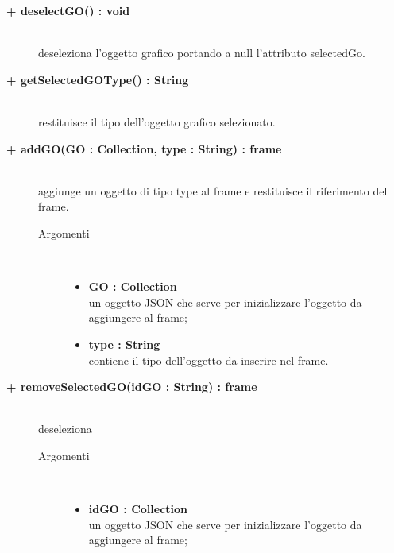 \begin{description}
\begin{description}
\begin{description}
\begin{description}
\end{description}

\end{description}

\begin{description}
		\item[\textbf{+ deselectGO() : void			}] \hfill \\
			deseleziona l'oggetto grafico portando a null l'attributo selectedGo. 
\end{description}

\begin{description}
		\item[\textbf{+ getSelectedGOType() : String			}] \hfill \\
			restituisce il tipo dell'oggetto grafico selezionato.
\end{description}

\begin{description}
		\item[\textbf{+ addGO(GO : Collection, type : String) : frame			}] \hfill \\
			aggiunge un oggetto di tipo type al frame e restituisce il riferimento del frame.  

\begin{description}
			\item[Argomenti] \hfill \\
				\begin{itemize}
						\item \textbf{GO : Collection			} \hfill \\
					un oggetto JSON che serve per inizializzare l'oggetto da aggiungere al frame;
					  	\item \textbf{type : String			} \hfill \\
					  	contiene il tipo dell'oggetto da inserire nel frame.
				\end{itemize}

\end{description}

\end{description}

\begin{description}
		\item[\textbf{+ removeSelectedGO(idGO : String) : frame			}] \hfill \\
			deseleziona  

\begin{description}
			\item[Argomenti] \hfill \\
				\begin{itemize}
						\item \textbf{idGO : Collection			} \hfill \\
					un oggetto JSON che serve per inizializzare l'oggetto da aggiungere al frame;
				\end{itemize}


\end{description}
\end{description}
\end{description}
\end{description}
